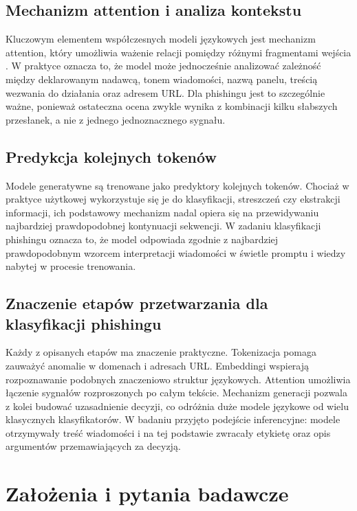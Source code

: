 \documentclass[12pt,a4paper,openany]{report}
\begin{document}
\section{Mechanizm attention i analiza kontekstu}

Kluczowym elementem współczesnych modeli językowych jest mechanizm attention, który umożliwia ważenie relacji pomiędzy różnymi fragmentami wejścia \cite{vaswani2017attention}. W praktyce oznacza to, że model może jednocześnie analizować zależność między deklarowanym nadawcą, tonem wiadomości, nazwą panelu, treścią wezwania do działania oraz adresem URL. Dla phishingu jest to szczególnie ważne, ponieważ ostateczna ocena zwykle wynika z kombinacji kilku słabszych przesłanek, a nie z jednego jednoznacznego sygnału.

\section{Predykcja kolejnych tokenów}

Modele generatywne są trenowane jako predyktory kolejnych tokenów. Chociaż w praktyce użytkowej wykorzystuje się je do klasyfikacji, streszczeń czy ekstrakcji informacji, ich podstawowy mechanizm nadal opiera się na przewidywaniu najbardziej prawdopodobnej kontynuacji sekwencji. W zadaniu klasyfikacji phishingu oznacza to, że model odpowiada zgodnie z najbardziej prawdopodobnym wzorcem interpretacji wiadomości w świetle promptu i wiedzy nabytej w procesie trenowania.

\section{Znaczenie etapów przetwarzania dla klasyfikacji phishingu}

Każdy z opisanych etapów ma znaczenie praktyczne. Tokenizacja pomaga zauważyć anomalie w domenach i adresach URL. Embeddingi wspierają rozpoznawanie podobnych znaczeniowo struktur językowych. Attention umożliwia łączenie sygnałów rozproszonych po całym tekście. Mechanizm generacji pozwala z kolei budować uzasadnienie decyzji, co odróżnia duże modele językowe od wielu klasycznych klasyfikatorów. W badaniu przyjęto podejście inferencyjne: modele otrzymywały treść wiadomości i na tej podstawie zwracały etykietę oraz opis argumentów przemawiających za decyzją.

\chapter{Założenia i pytania badawcze}
\end{document}
